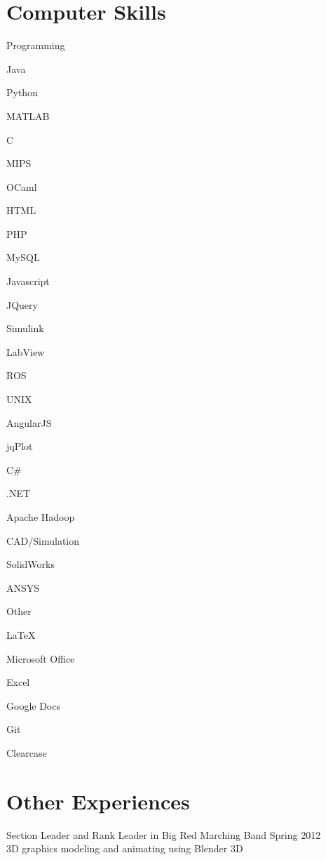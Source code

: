 \documentclass{BradyResume}
\begin{document}
\section*{Computer Skills}
\begin{delimlist}{Programming}
    \item Java
    \item Python
    \item MATLAB
    \item C
    \item MIPS
    \item OCaml
    \item HTML
    \item PHP
    \item MySQL
    \item Javascript
    \item JQuery
    \item Simulink 
    \item LabView
    \item ROS
    \item UNIX
    \item AngularJS
    \item jqPlot
    \item C\#
    \item .NET
    \item Apache Hadoop
\end{delimlist}

\begin{delimlist}{CAD/Simulation}
    \item SolidWorks
    \item ANSYS
\end{delimlist}

\begin{delimlist}{Other}
    \item \LaTeX\ 
    \item Microsoft Office%
    \item Excel
    \item Google Docs
    \item Git
    \item Clearcase
\end{delimlist}

\section*{Other Experiences}
Section Leader and Rank Leader in Big Red Marching Band \dotfill Spring 2012\\
3D graphics modeling and animating using Blender 3D
\end{document}
